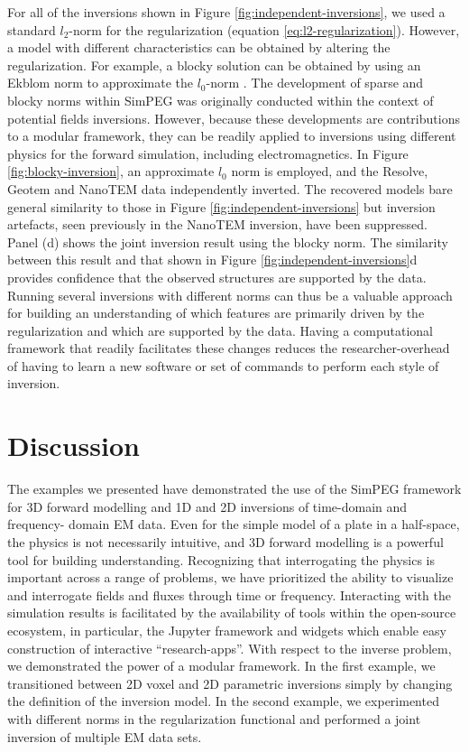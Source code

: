 \documentclass[paper]{geophysics}
\begin{document}
For all of the inversions shown in Figure \ref{fig:independent-inversions}, we used a standard $l_2$-norm for the regularization (equation \ref{eq:l2-regularization}). However, a model with different characteristics can be obtained by altering the regularization. For example, a blocky solution can be obtained by using an Ekblom norm to approximate the $l_0$-norm \citep{Fournier2016}. The development of sparse and blocky norms within SimPEG was originally conducted within the context of potential fields inversions. However, because  these developments are contributions to a modular framework, they can be readily applied to inversions using different physics for the forward simulation, including electromagnetics. In Figure \ref{fig:blocky-inversion}, an approximate $l_0$ norm is employed, and the Resolve, Geotem and NanoTEM data independently inverted. The recovered models bare general similarity to those in Figure \ref{fig:independent-inversions} but inversion artefacts, seen previously in the NanoTEM inversion, have been suppressed. Panel (d) shows the joint inversion result using the blocky norm. The similarity between this result and that shown in Figure \ref{fig:independent-inversions}d provides confidence that the observed structures are supported by the data.  Running several inversions with different norms can thus be a valuable approach for building an understanding of which features are primarily driven by the regularization and which are supported by the data. Having a computational framework that readily facilitates these changes reduces the researcher-overhead of having to learn a new software or set of commands to perform each style of inversion.





\section{Discussion}

The examples we presented have demonstrated the use of the SimPEG framework for 3D forward modelling and 1D and 2D inversions of time-domain and frequency- domain EM data. Even for the simple model of a plate in a half-space, the physics is not necessarily intuitive, and 3D forward modelling is a powerful tool for building understanding. Recognizing that interrogating the physics is important across a range of problems, we have prioritized the ability to visualize and interrogate fields and fluxes through time or frequency. Interacting with the simulation results is facilitated by the availability of tools within the open-source ecosystem, in particular, the Jupyter framework and widgets which enable easy construction of interactive ``research-apps''. With respect to the inverse problem, we demonstrated the power of a modular framework. In the first example, we transitioned between 2D voxel and 2D parametric inversions simply by changing the definition of the inversion model. In the second example, we experimented with different norms in the regularization functional and performed a joint inversion of multiple EM data sets.
\end{document}

